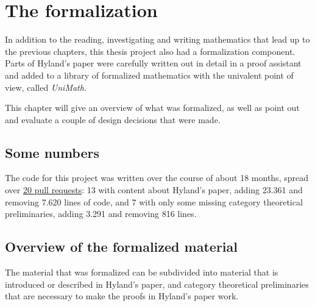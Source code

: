 \chapter{The formalization}
In addition to the reading, investigating and writing mathematics that lead up to the previous chapters, this thesis project also had a formalization component. Parts of Hyland's paper were carefully written out in detail in a proof assistant and added to a library of formalized mathematics with the univalent point of view, called \textit{UniMath}.

This chapter will give an overview of what was formalized, as well as point out and evaluate a couple of design decisions that were made.


\section{Some numbers}
The code for this project was written over the course of about 18 months, spread over \href{https://github.com/UniMath/UniMath/pulls?q=is%3Apr+author%3Aarnoudvanderleer+is%3Aclosed}{20 pull requests}: 13 with content about Hyland's paper, adding 23.361 and removing 7.620 lines of code, and 7 with only some missing category theoretical preliminaries, adding 3.291 and removing 816 lines.

\section{Overview of the formalized material}
The material that was formalized can be subdivided into material that is introduced or described in Hyland's paper, and category theoretical preliminaries that are necessary to make the proofs in Hyland's paper work.

